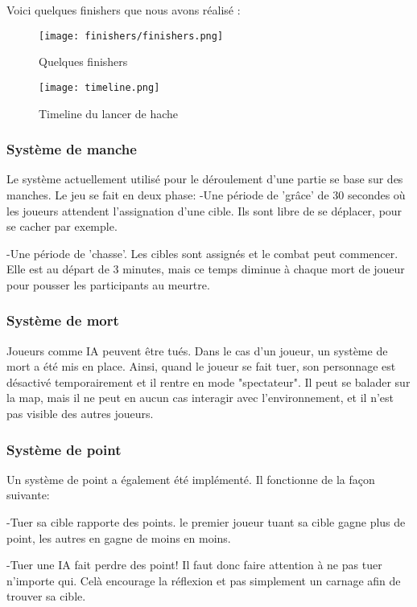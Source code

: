 Voici quelques finishers que nous avons réalisé :

\begin{figure}[hbt!]
    \centering
    \texttt{[image: finishers/finishers.png]}
    \caption{Quelques finishers}
\end{figure}

\FloatBarrier
\begin{figure}[hbt!]
    \centering
    \texttt{[image: timeline.png]}
    \caption{Timeline du lancer de hache}
\end{figure}


\subsubsection{Système de manche}
    Le système actuellement utilisé pour le déroulement d'une partie se base sur des manches. Le jeu se fait en deux phase:
    	-Une période de 'grâce' de 30 secondes où les joueurs attendent l'assignation d'une cible. 
	 Ils sont libre de se déplacer, pour se cacher par exemple.

	-Une période de 'chasse'. Les cibles sont assignés et le combat peut commencer. Elle est au départ de 3 minutes, mais ce temps
	 diminue à chaque mort de joueur pour pousser les participants au meurtre.

\subsubsection{Système de mort}
    Joueurs comme IA peuvent être tués. Dans le cas d'un joueur, un système de mort a été mis en place. Ainsi,
    quand le joueur se fait tuer, son personnage est désactivé temporairement et il rentre
    en mode "spectateur". Il peut se balader sur la map, mais il ne peut en aucun cas interagir avec l'environnement,
	et il n'est pas visible des autres joueurs.

\subsubsection{Système de point}
    Un système de point a également été implémenté. Il fonctionne de la façon suivante:
    
	-Tuer sa cible rapporte des points. le premier joueur tuant sa cible gagne plus de point, les autres en gagne de moins en moins.
	
	-Tuer une IA fait perdre des point! Il faut donc faire attention à ne pas tuer n'importe qui. Celà encourage la réflexion et pas 	 simplement un carnage afin de trouver sa cible.
	
